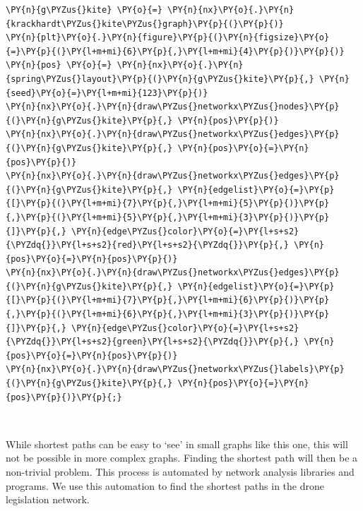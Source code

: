     \begin{tcolorbox}[breakable, size=fbox, boxrule=1pt, pad at break*=1mm,colback=cellbackground, colframe=cellborder]
\begin{Verbatim}[commandchars=\\\{\}]
\PY{n}{g\PYZus{}kite} \PY{o}{=} \PY{n}{nx}\PY{o}{.}\PY{n}{krackhardt\PYZus{}kite\PYZus{}graph}\PY{p}{(}\PY{p}{)}
\PY{n}{plt}\PY{o}{.}\PY{n}{figure}\PY{p}{(}\PY{n}{figsize}\PY{o}{=}\PY{p}{(}\PY{l+m+mi}{6}\PY{p}{,}\PY{l+m+mi}{4}\PY{p}{)}\PY{p}{)}
\PY{n}{pos} \PY{o}{=} \PY{n}{nx}\PY{o}{.}\PY{n}{spring\PYZus{}layout}\PY{p}{(}\PY{n}{g\PYZus{}kite}\PY{p}{,} \PY{n}{seed}\PY{o}{=}\PY{l+m+mi}{123}\PY{p}{)}
\PY{n}{nx}\PY{o}{.}\PY{n}{draw\PYZus{}networkx\PYZus{}nodes}\PY{p}{(}\PY{n}{g\PYZus{}kite}\PY{p}{,} \PY{n}{pos}\PY{p}{)}
\PY{n}{nx}\PY{o}{.}\PY{n}{draw\PYZus{}networkx\PYZus{}edges}\PY{p}{(}\PY{n}{g\PYZus{}kite}\PY{p}{,} \PY{n}{pos}\PY{o}{=}\PY{n}{pos}\PY{p}{)}
\PY{n}{nx}\PY{o}{.}\PY{n}{draw\PYZus{}networkx\PYZus{}edges}\PY{p}{(}\PY{n}{g\PYZus{}kite}\PY{p}{,} \PY{n}{edgelist}\PY{o}{=}\PY{p}{[}\PY{p}{(}\PY{l+m+mi}{7}\PY{p}{,}\PY{l+m+mi}{5}\PY{p}{)}\PY{p}{,}\PY{p}{(}\PY{l+m+mi}{5}\PY{p}{,}\PY{l+m+mi}{3}\PY{p}{)}\PY{p}{]}\PY{p}{,} \PY{n}{edge\PYZus{}color}\PY{o}{=}\PY{l+s+s2}{\PYZdq{}}\PY{l+s+s2}{red}\PY{l+s+s2}{\PYZdq{}}\PY{p}{,} \PY{n}{pos}\PY{o}{=}\PY{n}{pos}\PY{p}{)}
\PY{n}{nx}\PY{o}{.}\PY{n}{draw\PYZus{}networkx\PYZus{}edges}\PY{p}{(}\PY{n}{g\PYZus{}kite}\PY{p}{,} \PY{n}{edgelist}\PY{o}{=}\PY{p}{[}\PY{p}{(}\PY{l+m+mi}{7}\PY{p}{,}\PY{l+m+mi}{6}\PY{p}{)}\PY{p}{,}\PY{p}{(}\PY{l+m+mi}{6}\PY{p}{,}\PY{l+m+mi}{3}\PY{p}{)}\PY{p}{]}\PY{p}{,} \PY{n}{edge\PYZus{}color}\PY{o}{=}\PY{l+s+s2}{\PYZdq{}}\PY{l+s+s2}{green}\PY{l+s+s2}{\PYZdq{}}\PY{p}{,} \PY{n}{pos}\PY{o}{=}\PY{n}{pos}\PY{p}{)}
\PY{n}{nx}\PY{o}{.}\PY{n}{draw\PYZus{}networkx\PYZus{}labels}\PY{p}{(}\PY{n}{g\PYZus{}kite}\PY{p}{,} \PY{n}{pos}\PY{o}{=}\PY{n}{pos}\PY{p}{)}\PY{p}{;}
\end{Verbatim}
\end{tcolorbox}

    \begin{center}
    \end{center}
    { \hspace*{\fill} \\}
    
    While shortest paths can be easy to `see' in small graphs like this one,
this will not be possible in more complex graphs. Finding the shortest
path will then be a non-trivial problem. This process is automated by
network analysis libraries and programs. We use this automation to find
the shortest paths in the drone legislation network.

